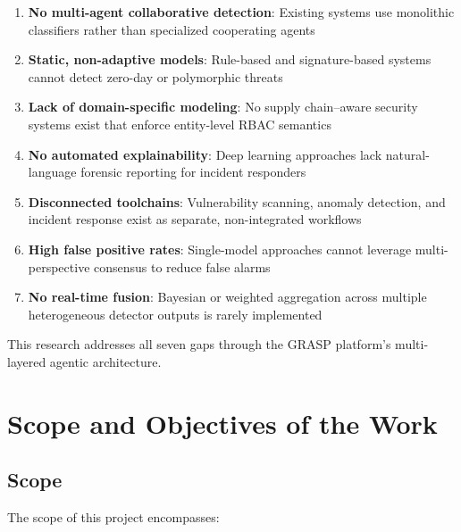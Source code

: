 \documentclass[12pt, a4paper]{report}
\begin{document}
\begin{enumerate}
    \item \textbf{No multi-agent collaborative detection}: Existing systems use monolithic classifiers rather than specialized cooperating agents
    \item \textbf{Static, non-adaptive models}: Rule-based and signature-based systems cannot detect zero-day or polymorphic threats
    \item \textbf{Lack of domain-specific modeling}: No supply chain--aware security systems exist that enforce entity-level RBAC semantics
    \item \textbf{No automated explainability}: Deep learning approaches lack natural-language forensic reporting for incident responders
    \item \textbf{Disconnected toolchains}: Vulnerability scanning, anomaly detection, and incident response exist as separate, non-integrated workflows
    \item \textbf{High false positive rates}: Single-model approaches cannot leverage multi-perspective consensus to reduce false alarms
    \item \textbf{No real-time fusion}: Bayesian or weighted aggregation across multiple heterogeneous detector outputs is rarely implemented
\end{enumerate}

This research addresses all seven gaps through the GRASP platform's multi-layered agentic architecture.


\chapter{Scope and Objectives of the Work}

\section{Scope}

The scope of this project encompasses:
\end{document}
